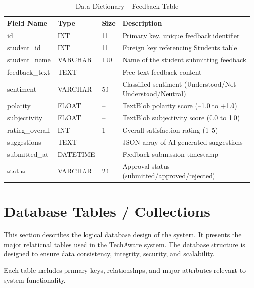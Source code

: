 \begin{table}[H]
\centering
\caption{Data Dictionary -- Feedback Table}
\begin{tabularx}{\textwidth}{|p{3cm}|p{2cm}|p{2cm}|X|}
\hline
\textbf{Field Name} & \textbf{Type} & \textbf{Size} & \textbf{Description} \\
\hline
id & INT & 11 & Primary key, unique feedback identifier \\
\hline
student\_id & INT & 11 & Foreign key referencing Students table \\
\hline
student\_name & VARCHAR & 100 & Name of the student submitting feedback \\
\hline
feedback\_text & TEXT & -- & Free-text feedback content \\
\hline
sentiment & VARCHAR & 50 & Classified sentiment (Understood/Not Understood/Neutral) \\
\hline
polarity & FLOAT & -- & TextBlob polarity score (--1.0 to +1.0) \\
\hline
subjectivity & FLOAT & -- & TextBlob subjectivity score (0.0 to 1.0) \\
\hline
rating\_overall & INT & 1 & Overall satisfaction rating (1--5) \\
\hline
suggestions & TEXT & -- & JSON array of AI-generated suggestions \\
\hline
submitted\_at & DATETIME & -- & Feedback submission timestamp \\
\hline
status & VARCHAR & 20 & Approval status (submitted/approved/rejected) \\
\hline
\end{tabularx}
\end{table}

\section{Database Tables / Collections}

This section describes the logical database design of the system. It presents the major relational tables used in the TechAware system. The database structure is designed to ensure data consistency, integrity, security, and scalability.

Each table includes primary keys, relationships, and major attributes relevant to system functionality.



